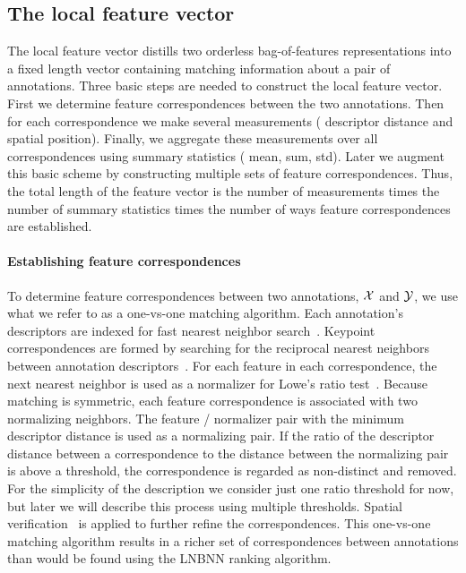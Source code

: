 \subsection{The local feature vector}
The local feature vector distills two orderless bag-of-features representations into a fixed length vector
  containing matching information about a pair of annotations.
Three basic steps are needed to construct the local feature vector.
First we determine feature correspondences between the two annotations.
Then for each correspondence we make several measurements (\eg{} descriptor distance and spatial position).
Finally, we aggregate these measurements over all correspondences using summary statistics (\eg{} mean, sum,
  std).
Later we augment this basic scheme by constructing multiple sets of feature correspondences.
Thus, the total length of the feature vector is the number of measurements times the number of summary statistics
  times the number of ways feature correspondences are established.


\paragraph{Establishing feature correspondences}
To determine feature correspondences between two annotations, $\mathcal{X}$ and $\mathcal{Y}$, we use what we refer to as a
  one-vs-one matching algorithm.
Each annotation's descriptors are indexed for fast nearest neighbor search~\cite{muja_fast_2009}.
Keypoint correspondences are formed by searching for the reciprocal nearest neighbors between annotation
  descriptors~\cite{qin_hello_2011}.
For each feature in each correspondence, the next nearest neighbor is used as a normalizer for Lowe's ratio
  test~\cite{lowe_distinctive_2004}.
Because matching is symmetric, each feature correspondence is associated with two normalizing neighbors.
The feature / normalizer pair with the minimum descriptor distance is used as a normalizing pair.
If the ratio of the descriptor distance between a correspondence to the distance between the normalizing pair is
  above a threshold, the correspondence is regarded as non-distinct and removed.
For the simplicity of the description we consider just one ratio threshold for now, but later we will describe
  this process using multiple thresholds.
Spatial verification~\cite{philbin_object_2007} is applied to further refine the correspondences.
This one-vs-one matching algorithm results in a richer set of correspondences between annotations than would be
  found using the LNBNN ranking algorithm.


